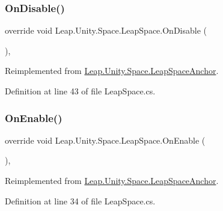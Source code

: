 \mbox{\label{class_leap_1_1_unity_1_1_space_1_1_leap_space_abc3c50579682cc467e55f2f857f18321}} 
\subsubsection{\texorpdfstring{OnDisable()}{OnDisable()}}
{\footnotesize\ttfamily override void Leap.\+Unity.\+Space.\+Leap\+Space.\+On\+Disable (\begin{DoxyParamCaption}{ }\end{DoxyParamCaption})\hspace{0.3cm}{\ttfamily [protected]}, {\ttfamily [virtual]}}



Reimplemented from \mbox{\hyperlink{class_leap_1_1_unity_1_1_space_1_1_leap_space_anchor_a32bd2bf4b3fd30ee608f1e6b2d07af88}{Leap.\+Unity.\+Space.\+Leap\+Space\+Anchor}}.



Definition at line 43 of file Leap\+Space.\+cs.

\mbox{\label{class_leap_1_1_unity_1_1_space_1_1_leap_space_ad15999d46ce8be0203f2a5b67ced8a8e}} 
\subsubsection{\texorpdfstring{OnEnable()}{OnEnable()}}
{\footnotesize\ttfamily override void Leap.\+Unity.\+Space.\+Leap\+Space.\+On\+Enable (\begin{DoxyParamCaption}{ }\end{DoxyParamCaption})\hspace{0.3cm}{\ttfamily [protected]}, {\ttfamily [virtual]}}



Reimplemented from \mbox{\hyperlink{class_leap_1_1_unity_1_1_space_1_1_leap_space_anchor_abc81e1e200c6c14e6dab295309b7c854}{Leap.\+Unity.\+Space.\+Leap\+Space\+Anchor}}.



Definition at line 34 of file Leap\+Space.\+cs.

